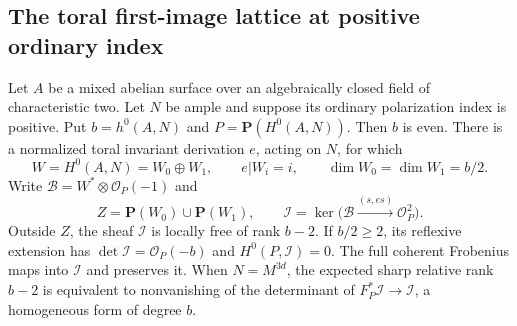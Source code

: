\subsection{The toral first-image lattice at positive ordinary index}

\begin{lemma}
\label{lem:DE-A3-positive-index-image-candidate}
Let $A$ be a mixed abelian surface over an algebraically closed field
of characteristic two. Let $N$ be ample and suppose its ordinary
polarization index is positive. Put $b=h^0(A,N)$ and
$P=\mathbf P(H^0(A,N))$. Then $b$ is even. There is a normalized
toral invariant derivation $e$, acting on $N$, for which
\[
 W=H^0(A,N)=W_0\oplus W_1,\qquad
 e|W_i=i,\qquad\dim W_0=\dim W_1=b/2.
\]
Write $\mathcal B=W^*\otimes\mathcal O_P(-1)$ and
\[
 Z=\mathbf P(W_0)\cup\mathbf P(W_1),\qquad
 \mathcal I=\ker\bigl(\mathcal B
       \xrightarrow{(s,es)}\mathcal O_P^2\bigr).
\]
Outside $Z$, the sheaf $\mathcal I$ is locally free of rank $b-2$.
If $b/2\ge2$, its reflexive extension has
$\det\mathcal I=\mathcal O_P(-b)$ and $H^0(P,\mathcal I)=0$.
The full coherent Frobenius maps into $\mathcal I$ and preserves it.
When $N=M^{3d}$, the expected sharp relative rank $b-2$ is equivalent
to nonvanishing of the determinant of
$F_P^*\mathcal I\to\mathcal I$, a homogeneous form of degree $b$.
\end{lemma}

